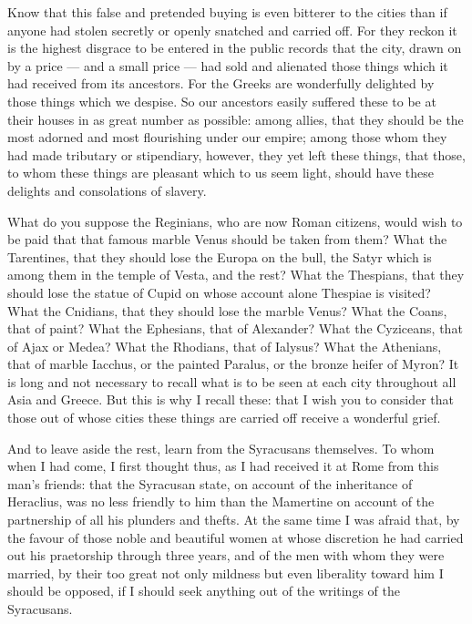 Know that this false and pretended buying is even bitterer to the cities than if anyone had stolen secretly or openly snatched and carried off. For they reckon it is the highest disgrace to be entered in the public records that the city, drawn on by a price --- and a small price --- had sold and alienated those things which it had received from its ancestors. For the Greeks are wonderfully delighted by those things which we despise. So our ancestors easily suffered these to be at their houses in as great number as possible: among allies, that they should be the most adorned and most flourishing under our empire; among those whom they had made tributary or stipendiary, however, they yet left these things, that those, to whom these things are pleasant which to us seem light, should have these delights and consolations of slavery.

 What do you suppose the Reginians, who are now Roman citizens, would wish to be paid that that famous marble Venus should be taken from them? What the Tarentines, that they should lose the Europa on the bull, the Satyr which is among them in the temple of Vesta, and the rest? What the Thespians, that they should lose the statue of Cupid on whose account alone Thespiae is visited? What the Cnidians, that they should lose the marble Venus? What the Coans, that of paint? What the Ephesians, that of Alexander? What the Cyziceans, that of Ajax or Medea? What the Rhodians, that of Ialysus? What the Athenians, that of marble Iacchus, or the painted Paralus, or the bronze heifer of Myron? It is long and not necessary to recall what is to be seen at each city throughout all Asia and Greece. But this is why I recall these: that I wish you to consider that those out of whose cities these things are carried off receive a wonderful grief.

 And to leave aside the rest, learn from the Syracusans themselves. To whom when I had come, I first thought thus, as I had received it at Rome from this man's friends: that the Syracusan state, on account of the inheritance of Heraclius, was no less friendly to him than the Mamertine on account of the partnership of all his plunders and thefts. At the same time I was afraid that, by the favour of those noble and beautiful women at whose discretion he had carried out his praetorship through three years, and of the men with whom they were married, by their too great not only mildness but even liberality toward him I should be opposed, if I should seek anything out of the writings of the Syracusans.

